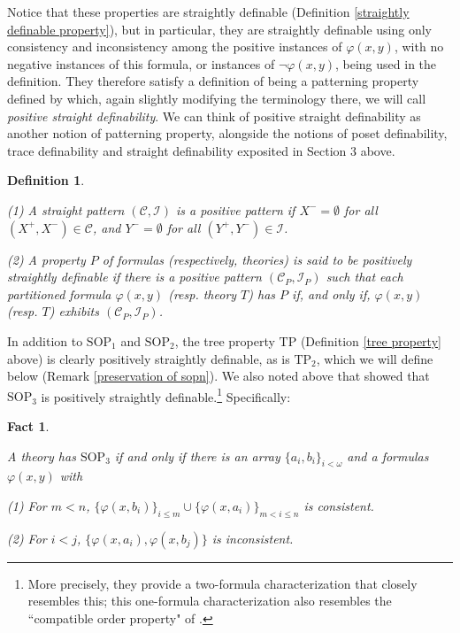 \documentclass[10pt,a4paper]{amsart}
\newcommand{\calC}{\mathcal{C}}
\newcommand{\calI}{\mathcal{I}}
\newcommand{\vphi}{\varphi}
\newtheorem{fact}{Fact}
\newtheorem{definition}{Definition}
\begin{document}
Notice that these properties are straightly definable (Definition \ref{straightly definable property}), but in particular, they are straightly definable using only consistency and inconsistency among the positive instances of $\varphi(x, y)$, with no negative instances of this formula, or instances of $\neg\varphi(x, y)$, being used in the definition. They therefore satisfy a definition of being a patterning property defined by \cite{bailetti2024walk} which, again slightly modifying the terminology there, we will call \textit{positive straight definability}. We can think of positive straight definability as another notion of patterning property, alongside the notions of poset definability, trace definability and straight definability exposited in Section 3 above.

\begin{definition}\label{positively straightly definable property}
    
    (1) A straight pattern $(\mathcal{C}, \mathcal{I})$ is a \textit{positive pattern} if $X^{-} = \emptyset$ for all $(X^{+}, X^{-}) \in \mathcal{C}$, and $Y^{-} = \emptyset$ for all $(Y^{+}, Y^{-}) \in \mathcal{I}$.
    
    
    (2) A property $P$ of formulas (respectively, theories) is said to be \textit{positively straightly definable} if there is a positive pattern $(\calC_P,\calI_P)$ such that each partitioned formula $\vphi(x,y)$ (resp. theory $T$) has $P$ if, and only if, $\vphi(x,y)$ (resp. $T$) exhibits $(\calC_P,\calI_P)$.
\end{definition}

In addition to $\mathrm{SOP}_{1}$ and $\mathrm{SOP}_{2}$, the tree property $\mathrm{TP}$ (Definition \ref{tree property} above) is clearly positively straightly definable, as is $\mathrm{TP}_{2}$, which we will define below (Remark \ref{preservation of sopn}). We also noted above that \cite{shelah_usvyatsov_2008} showed that $\mathrm{SOP}_{3}$ is positively straightly definable.\footnote{More precisely, they provide a two-formula characterization that closely resembles this; this one-formula characterization also resembles the ``compatible order property" of \cite{Mal10}.} Specifically:

\begin{fact}
\label{positive straight definition of sop3}

A theory has $\mathrm{SOP}_{3}$ if and only if there is an array $\{a_{i}, b_{i}\}_{i < \omega}$ and a formulas $\varphi(x, y)$ with

    (1) For $m < n$, $\{\varphi(x, b_{i})\}_{i \leq m} \cup \{\varphi(x, a_{i})\}_{m < i \leq n}$ is consistent.

    (2) For $ i < j$, $\{\varphi(x, a_{i}), \varphi(x, b_{j})\}$ is inconsistent.

    
\end{fact}
\end{document}
